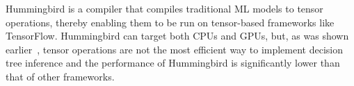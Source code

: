 Hummingbird\cite{Hummingbird} is a compiler that compiles traditional ML models
to tensor operations, thereby enabling them to be run on tensor-based frameworks like
TensorFlow\cite{TensorFlow}. Hummingbird can target both CPUs
and GPUs, but, as was shown earlier~\cite{Treebeard},
tensor operations are not the most efficient way to implement decision tree inference
and the performance of Hummingbird is significantly lower than 
that of other frameworks.




